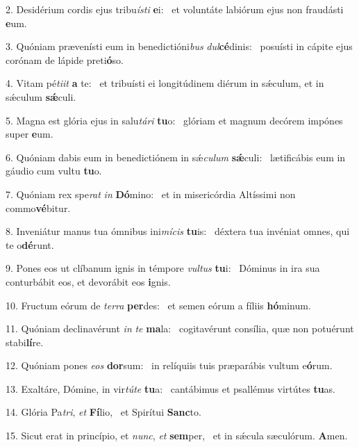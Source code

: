 2. Desidérium cordis ejus tribu\textit{ís}\textit{ti} \textbf{e}i: \ast\  et voluntáte labiórum ejus non fraudásti \textbf{e}um.\

3. Quóniam prævenísti eum in benedictióni\textit{bus} \textit{dul}\textbf{cé}dinis: \ast\  posuísti in cápite ejus corónam de lápide preti\textbf{ó}so.\

4. Vitam pé\textit{ti}\textit{it} \textbf{a} te: \ast\  et tribuísti ei longitúdinem diérum in sǽculum, et in sǽculum \textbf{sǽ}culi.\

5. Magna est glória ejus in salu\textit{tá}\textit{ri} \textbf{tu}o: \ast\  glóriam et magnum decórem impónes super \textbf{e}um.\

6. Quóniam dabis eum in benedictiónem in sǽ\textit{cu}\textit{lum} \textbf{sǽ}culi: \ast\  lætificábis eum in gáudio cum vultu \textbf{tu}o.\

7. Quóniam rex spe\textit{rat} \textit{in} \textbf{Dó}mino: \ast\  et in misericórdia Altíssimi non commo\textbf{vé}bitur.\

8. Inveniátur manus tua ómnibus ini\textit{mí}\textit{cis} \textbf{tu}is: \ast\  déxtera tua invéniat omnes, qui te o\textbf{dé}runt.\

9. Pones eos ut clíbanum ignis in témpore \textit{vul}\textit{tus} \textbf{tu}i: \ast\  Dóminus in ira sua conturbábit eos, et devorábit eos \textbf{i}gnis.\

10. Fructum eórum de \textit{ter}\textit{ra} \textbf{per}des: \ast\  et semen eórum a fíliis \textbf{hó}minum.\

11. Quóniam declinavérunt \textit{in} \textit{te} \textbf{ma}la: \ast\  cogitavérunt consília, quæ non potuérunt stabi\textbf{lí}re.\

12. Quóniam pones \textit{e}\textit{os} \textbf{dor}sum: \ast\  in relíquiis tuis præparábis vultum e\textbf{ó}rum.\

13. Exaltáre, Dómine, in vir\textit{tú}\textit{te} \textbf{tu}a: \ast\  cantábimus et psallémus virtútes \textbf{tu}as.\

14. Glória Pa\textit{tri}, \textit{et} \textbf{Fí}lio, \ast\  et Spirítui \textbf{Sanc}to.\

15. Sicut erat in princípio, et \textit{nunc}, \textit{et} \textbf{sem}per, \ast\  et in sǽcula sæculórum. \textbf{A}men.\

